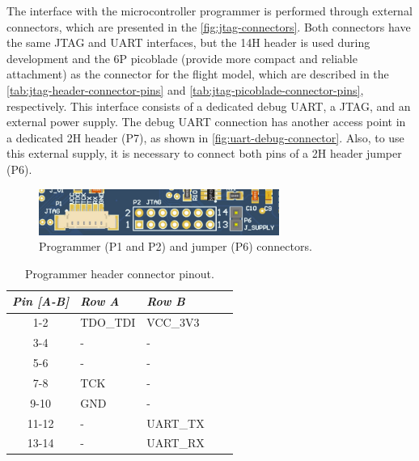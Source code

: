 The interface with the microcontroller programmer is performed through external connectors, which are presented in the \autoref{fig:jtag-connectors}. Both connectors have the same JTAG and UART interfaces, but the 14H header is used during development and the 6P picoblade (provide more compact and reliable attachment) as the connector for the flight model, which are described in the \autoref{tab:jtag-header-connector-pins} and \autoref{tab:jtag-picoblade-connector-pins}, respectively. This interface consists of a dedicated debug UART, a JTAG, and an external power supply. The debug UART connection has another access point in a dedicated 2H header (P7), as shown in \autoref{fig:uart-debug-connector}. Also, to use this external supply, it is necessary to connect both pins of a 2H header jumper (P6).

\begin{figure}[!ht]
    \begin{center}
        \includegraphics[width=0.7\textwidth]{figures/jtag-connector.png}
        \caption{Programmer (P1 and P2) and jumper (P6) connectors.}
        \label{fig:jtag-connectors}
    \end{center}
\end{figure}

\begin{table}[!h]
    \centering
    \begin{tabular}{cllll}
        \toprule[1.5pt]
        \textit{Pin [A-B]} & \textit{Row A} & \textit{Row B} \\
        \midrule
        1-2                & TDO\_TDI       & VCC\_3V3       \\
        3-4                & -              & -              \\
        5-6                & -              & -              \\
        7-8                & TCK            & -              \\
        9-10               & GND            & -              \\
        11-12              & -              & UART\_TX       \\
        13-14              & -              & UART\_RX       \\
        \bottomrule[1.5pt]
    \end{tabular}
    \caption{Programmer header connector pinout.}
    \label{tab:jtag-header-connector-pins}
\end{table}

